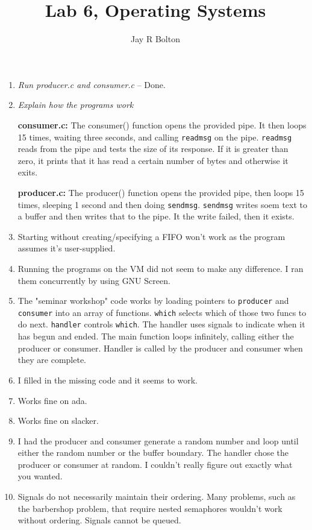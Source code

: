 \documentclass{article}
\title{Lab 6, Operating Systems}
\author{Jay R Bolton}
\begin{document}
\maketitle

\begin{enumerate}

\item
\emph{Run producer.c and consumer.c} -- Done.

\item
\emph{Explain how the programs work}

\textbf{consumer.c:} The consumer() function opens the provided pipe. It then
loops 15 times, waiting three seconds, and calling \texttt{readmsg} on the
pipe. \texttt{readmsg} reads from the pipe and tests the size of its response.
If it is greater than zero, it prints that it has read a certain number of
bytes and otherwise it exits.

\textbf{producer.c:} The producer() function opens the provided pipe, then
loops 15 times, sleeping 1 second and then doing \texttt{sendmsg}.
\texttt{sendmsg} writes soem text to a buffer and then writes that to the pipe.
It the write failed, then it exists.

\item
Starting without creating/specifying a FIFO won't work as the program assumes
it's user-supplied.

\item
Running the programs on the VM did not seem to make any difference. I ran them
concurrently by using GNU Screen.

\item
The "seminar workshop" code works by loading pointers to \texttt{producer} and
\texttt{consumer} into an array of functions. \texttt{which} selects which of
those two funcs to do next. \texttt{handler} controls \texttt{which}. The
handler uses signals to indicate when it has begun and ended.  The main
function loops infinitely, calling either the producer or consumer. Handler is
called by the producer and consumer when they are complete.

\item
I filled in the missing code and it seems to work.

\item
Works fine on ada.

\item
Works fine on slacker.

\item
I had the producer and consumer generate a random number and loop until either
the random number or the buffer boundary. The handler chose the producer or
consumer at random. I couldn't really figure out exactly what you wanted.

\item
Signals do not necessarily maintain their ordering. Many problems, such as the
barbershop problem, that require nested semaphores wouldn't work without
ordering. Signals cannot be queued.

\end{enumerate}
\end{document}
